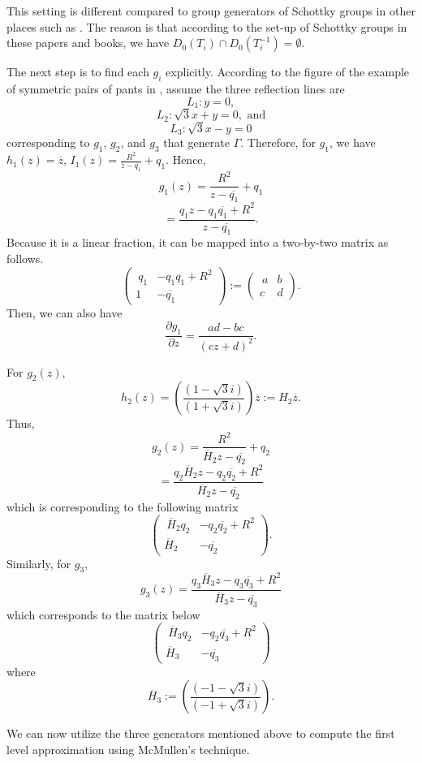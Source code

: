 \documentclass[12pt,oneside]{sfsuthesis}
\theoremstyle{plain} %
\theoremstyle{definition}  %
\theoremstyle{remark}  %
\theoremstyle{plain}
\begin{document}
{This setting is different compared to group generators of Schottky groups in other places such as \cite{borthwick2007spectral, dal2010geodesic, bourgain2017fourier, bourgain2018spectral}. The reason is that according to the set-up of Schottky groups in these papers and books, we have $D_0(T_i)\cap D_0(T_i^{-1})=\emptyset$.

The next step is to find each $g_i$ explicitly. According to the figure of the example of symmetric pairs of pants in \cite{mcmullen1998hausdorff}, assume the three reflection lines are 
$$L_1: y=0,$$ 
$$L_2: \sqrt{3} x+ y=0, \text{ and}$$ 
$$L_3: \sqrt{3} x- y=0$$
corresponding to $g_1$, $g_2$, and $g_3$ that generate $\Gamma$. Therefore, for $g_1$, we have $h_1(z)=\overline{z}$, $I_1(z)=\frac{R^2}{\overline{z}-\overline{q_1}}+q_1$. Hence,
$$
g_1(z)=\frac{R^2}{z-\overline{q_1}}+q_1
$$
$$
=\frac{q_1z-q_1\overline{q_1}+R^2}{z-\overline{q_1}}.
$$
Because it is a linear fraction, it can be mapped into a two-by-two matrix as follows.
$$
\begin{pmatrix}\
q_1 & -q_1\overline{q_1}+R^2 \\
1 &  -\overline{q_1}
\end{pmatrix}:=\begin{pmatrix}\
a & b \\
c &  d
\end{pmatrix}.
$$
Then, we can also have
$$
\frac{\partial g_1}{\partial z} = \frac{ad-bc}{(cz+d)^2}.
$$

For $g_2(z)$, 
$$
h_2(z)=\left(\frac{(1-\sqrt{3}i)}{(1+\sqrt{3}i)} \right)\overline{z}:=H_2\overline{z}.
$$
Thus, 
$$
g_2(z)=\frac{R^2}{\overline{H}_2 z-\overline{q_2}}+q_2
$$
$$
=\frac{q_2 \overline{H}_2 z-q_2\overline{q_2}+R^2}{\overline{H}_2 z-\overline{q_2}}
$$
which is corresponding to the following matrix
$$
\begin{pmatrix}\
\overline{H}_2 q_2 & -q_2\overline{q_2}+R^2 \\
\overline{H}_2 &  -\overline{q_2}
\end{pmatrix}.
$$
Similarly, for $g_3$, 
$$
g_3(z)=\frac{q_3 \overline{H}_3 z-q_3\overline{q_3}+R^2}{\overline{H}_3 z-\overline{q_3}}
$$
which corresponds to the matrix below
$$
\begin{pmatrix}\
\overline{H}_3 q_2 & -q_2\overline{q_3}+R^2 \\
\overline{H}_3 &  -\overline{q_3}
\end{pmatrix}
$$
where 
$$
\overline{H}_3:=\left(\frac{(-1-\sqrt{3}i)}{(-1+\sqrt{3}i)} \right).
$$

We can now utilize the three generators mentioned above to compute the first level approximation using McMullen's technique.

}
\end{document}
